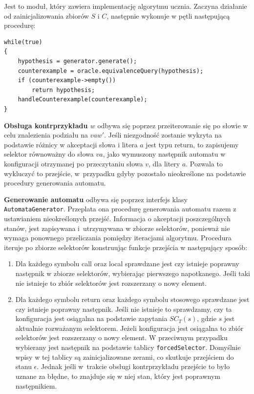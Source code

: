 Jest to moduł, który zawiera implementację algorytmu ucznia. Zaczyna działanie od zainicjalizowania zbiorów $S$ i $C$,
następnie wykonuje w pętli następującą procedurę:

\begin{verbatim}
while(true)
{
    hypothesis = generator.generate();
    counterexample = oracle.equivalenceQuery(hypothesis);
    if (counterexample->empty())
        return hypothesis;
    handleCounterexample(counterexample);
}
\end{verbatim}

\textbf{Obsługa kontrprzykładu $w$} odbywa się poprzez przeiterowanie się po słowie w celu znalezienia podziału na $vaw'$.
Jeśli niezgodność zostanie wykryta na podstawie różnicy w akceptacji słowa i litera $a$ jest typu return, to zapisujemy selektor równoważny do słowa $va$,
jako wymuszony następnik automatu w konfiguracji otrzymanej po przeczytaniu słowa $v$, dla litery $a$.
Pozwala to wykluczyć to przejście, w~przypadku gdyby pozostało nieokreślone na podstawie procedury generowania automatu.

\textbf{Generowanie automatu} odbywa się poprzez interfejs klasy \texttt{Automata\-Genera\-tor}. Przeplata ona procedurę generowania automatu
razem z ustawianiem nieokreślonych przejść.
Informacja o akceptacji poszczególnych stanów, jest zapisywana i~utrzymywana w zbiorze selektorów,
ponieważ nie wymaga ponownego przeliczania pomiędzy iteracjami algorytmu.
Procedura iteruje po zbiorze selektorów konstruując funkcje przejścia w następujący sposób:

\begin{enumerate}
    \item Dla każdego symbolu call oraz local sprawdzane jest czy istnieje poprawny następnik w zbiorze selektorów,
    wybierając pierwszego napotkanego. Jeśli taki nie istnieje to zbiór selektorów jest rozszerzany o nowy element.

    \item Dla każdego symbolu return oraz każdego symbolu stosowego sprawdzane jest czy istnieje poprawny następnik.
    Jeśli nie istnieje to sprawdzamy, czy ta konfiguracja jest osiągalna na podstawie zapytania $SC_T(s)$, gdzie $s$
    jest aktualnie rozważanym selektorem. Jeżeli konfiguracja jest osiągalna to zbiór selektorów jest rozszerzany o
    nowy element. W przeciwnym przypadku wybierany jest następnik na podstawie tablicy \texttt{forcedSelector}.
    Domyślnie wpisy w tej tablicy są zainicjalizowane zerami, co skutkuje przejściem do stanu $\epsilon$.
    Jednak jeśli w~trakcie obsługi kontrprzykładu przejście to było uznane za błędne,
    to znajduje się w niej stan, który jest poprawnym następnikiem. 
\end{enumerate}

